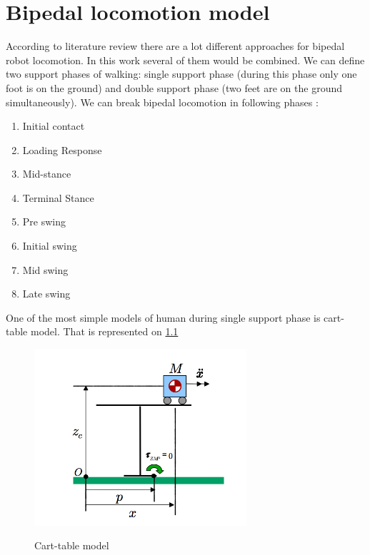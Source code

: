 \documentclass[12pt,a4paper]{report}
\begin{document}
		
	\chapter{Bipedal locomotion model}
		According to literature review there are a lot different approaches for bipedal robot locomotion. In this work several of them would be combined.
		We can define two support phases of walking: single support phase (during this phase only one foot is on the ground) and double support phase (two feet are on the ground simultaneously).
		We can break bipedal locomotion in following phases \cite{rostami1998impactless}:
		
		\begin{enumerate}
			\item Initial contact
			\item Loading Response
			\item Mid-stance
			\item Terminal Stance
			\item Pre swing
			\item Initial swing
			\item Mid swing
			\item Late swing			
		\end{enumerate}
		
		One of the most simple models of human during single support phase is cart-table model. That is represented on \cref{fig:6}
		
		\begin{figure}[h!]
			\vspace{-0.2cm}
			\centering
			{\includegraphics[width=0.7\textwidth]{6}}
			\caption{Cart-table model \cite{kajita2003biped}}
			\label{fig:6}
			\vspace{-0.1cm}
		\end{figure}
		
\end{document}
